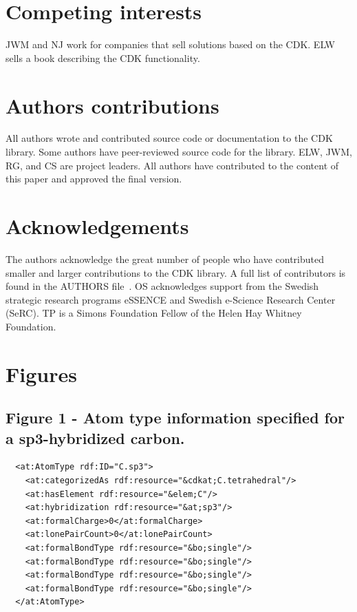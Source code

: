 \documentclass[10pt]{bmcart}
\begin{document}
\begin{backmatter}

\section*{Competing interests}
JWM and NJ work for companies that sell solutions based on the CDK. ELW sells
a book describing the CDK functionality.

\section*{Authors contributions}
All authors wrote and contributed source code or documentation to the CDK
library. Some authors have peer-reviewed source code for the library.
ELW, JWM, RG, and CS are project leaders. All authors have contributed to the
content of this paper and approved the final version.

\section*{Acknowledgements}
The authors acknowledge the great number of people who have contributed smaller
and larger contributions to the CDK library. A full list of contributors is
found in the AUTHORS file~\cite{AUTHORS}. OS acknowledges support from the Swedish strategic research programs eSSENCE and Swedish e-Science Research Center (SeRC). TP is a Simons Foundation Fellow of the Helen Hay Whitney Foundation.




\newpage

\section*{Figures}

\subsection*{Figure 1 - Atom type information specified for a sp3-hybridized
carbon.}\label{fig:atomtype}
\begin{verbatim}
  <at:AtomType rdf:ID="C.sp3">
    <at:categorizedAs rdf:resource="&cdkat;C.tetrahedral"/>
    <at:hasElement rdf:resource="&elem;C"/>
    <at:hybridization rdf:resource="&at;sp3"/>
    <at:formalCharge>0</at:formalCharge>
    <at:lonePairCount>0</at:lonePairCount>
    <at:formalBondType rdf:resource="&bo;single"/>
    <at:formalBondType rdf:resource="&bo;single"/>
    <at:formalBondType rdf:resource="&bo;single"/>
    <at:formalBondType rdf:resource="&bo;single"/>
  </at:AtomType>
\end{verbatim}


\end{backmatter}
\end{document}
